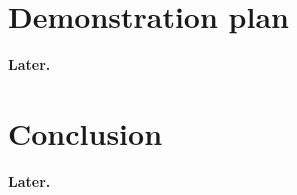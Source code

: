 \documentclass[onecolumn,10pt]{IEEEtran}
\newcommand{\myroot}{../}
\newcommand{\Later}{\textbf{Later.}}
\begin{document}
\section{Demonstration plan}
\Later

\section{Conclusion}
\Later



\end{document}
